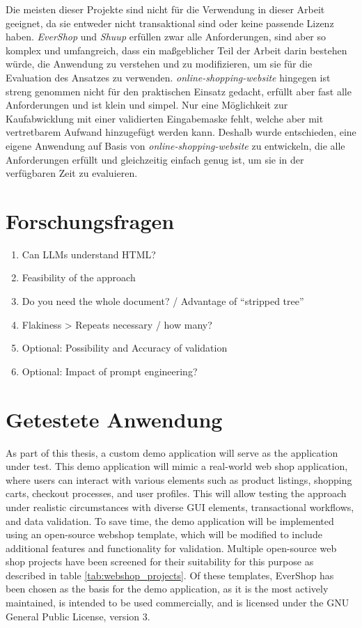 Die meisten dieser Projekte sind nicht für die Verwendung in dieser Arbeit geeignet, da sie entweder nicht transaktional sind oder keine passende Lizenz haben.
\textit{EverShop} und \textit{Shuup} erfüllen zwar alle Anforderungen, sind aber so komplex und umfangreich, dass ein maßgeblicher Teil der Arbeit darin bestehen würde, die Anwendung zu verstehen und zu modifizieren, um sie für die Evaluation des Ansatzes zu verwenden.
\textit{online-shopping-website} hingegen ist streng genommen nicht für den praktischen Einsatz gedacht, erfüllt aber fast alle Anforderungen und ist klein und simpel.
Nur eine Möglichkeit zur Kaufabwicklung mit einer validierten Eingabemaske fehlt, welche aber mit vertretbarem Aufwand hinzugefügt werden kann.
Deshalb wurde entschieden, eine eigene Anwendung auf Basis von \textit{online-shopping-website} zu entwickeln, die alle Anforderungen erfüllt und gleichzeitig einfach genug ist, um sie in der verfügbaren Zeit zu evaluieren.

\section{Forschungsfragen}

\begin{enumerate}
    \item Can LLMs understand HTML?
    \item Feasibility of the approach
    \item Do you need the whole document? / Advantage of “stripped tree”
    \item Flakiness > Repeats necessary / how many?
    \item Optional: Possibility and Accuracy of validation
    \item Optional: Impact of prompt engineering?
\end{enumerate}

\section{Getestete Anwendung}

As part of this thesis, a custom demo application will serve as the application under test.
This demo application will mimic a real-world web shop application, where users can interact with various elements such as product listings, shopping carts, checkout processes, and user profiles.
This will allow testing the approach under realistic circumstances with diverse GUI elements, transactional workflows, and data validation.
To save time, the demo application will be implemented using an open-source webshop template, which will be modified to include additional features and functionality for validation.
Multiple open-source web shop projects have been screened for their suitability for this purpose as described in table \ref{tab:webshop_projects}.
Of these templates, EverShop has been chosen as the basis for the demo application, as it is the most actively maintained, is intended to be used commercially, and is licensed under the GNU General Public License, version 3.


